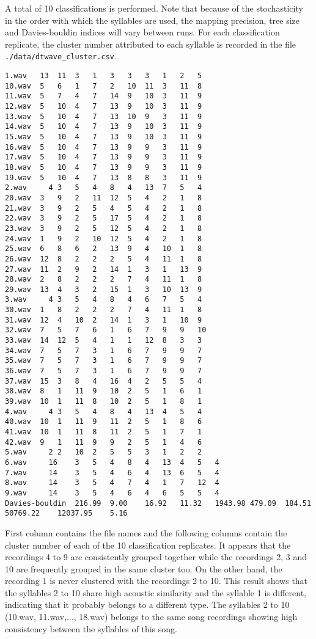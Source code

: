 \documentclass[a4paper]{article}
\begin{document}
A total of 10 classifications is performed.
Note that because of the stochasticity in the order with which the syllables are used, the mapping precision, tree size and Davies-bouldin indices will vary between runs.
For each classification replicate, the cluster number attributed to each syllable is recorded in the file \texttt{./data/dtwave\_cluster.csv}.

\color{lightgray}
\begin{verbatim}
1.wav 	13	11	3	1	3	3	3	1	2	5	
10.wav	5	6	1	7	2	10	11	3	11	8	
11.wav	5	7	4	7	14	9	10	3	11	9	
12.wav	5	10	4	7	13	9	10	3	11	9	
13.wav	5	10	4	7	13	10	9	3	11	9	
14.wav	5	10	4	7	13	9	10	3	11	9	
15.wav	5	10	4	7	13	9	10	3	11	9	
16.wav	5	10	4	7	13	9	9	3	11	9	
17.wav	5	10	4	7	13	9	9	3	11	9	
18.wav	5	10	4	7	13	9	9	3	11	9	
19.wav	5	10	4	7	13	8	8	3	11	9	
2.wav	  4	3	5	4	8	4	13	7	5	4	
20.wav	3	9	2	11	12	5	4	2	1	8	
21.wav	3	9	2	5	4	5	4	2	1	8	
22.wav	3	9	2	5	17	5	4	2	1	8	
23.wav	3	9	2	5	12	5	4	2	1	8	
24.wav	1	9	2	10	12	5	4	2	1	8	
25.wav	6	8	6	2	13	9	4	10	1	8	
26.wav	12	8	2	2	2	5	4	11	1	8	
27.wav	11	2	9	2	14	1	3	1	13	9	
28.wav	2	8	2	2	2	7	4	11	1	8	
29.wav	13	4	3	2	15	1	3	10	13	9	
3.wav	  4	3	5	4	8	4	6	7	5	4	
30.wav	1	8	2	2	2	7	4	11	1	8	
31.wav	12	4	10	2	14	1	3	1	10	9	
32.wav	7	5	7	6	1	6	7	9	9	10	
33.wav	14	12	5	4	1	1	12	8	3	3	
34.wav	7	5	7	3	1	6	7	9	9	7	
35.wav	7	5	7	3	1	6	7	9	9	7	
36.wav	7	5	7	3	1	6	7	9	9	7	
37.wav	15	3	8	4	16	4	2	5	5	4	
38.wav	8	1	11	9	10	2	5	1	6	1	
39.wav	10	1	11	8	10	2	5	1	8	1	
4.wav	  4	3	5	4	8	4	13	4	5	4	
40.wav	10	1	11	9	11	2	5	1	8	6	
41.wav	10	1	11	8	11	2	5	1	7	1	
42.wav	9	1	11	9	9	2	5	1	4	6	
5.wav	  2	2	10	2	5	5	3	1	2	2	
6.wav	  16	3	5	4	8	4	13	4	5	4	
7.wav	  14	3	5	4	6	4	13	6	5	4	
8.wav	  14	3	5	4	7	4	1	7	12	4	
9.wav	  14	3	5	4	6	4	6	5	5	4	
Davies-bouldin	216.99	9.00	16.92	11.32	1943.98	479.09	184.51	50769.22	12037.95	5.16	
\end{verbatim}
\color{black}

First column contains the file names and the following columns contain the cluster number of each of the 10 classification replicates.
It appears that the recordings 4 to 9 are consistently grouped together while the recordings 2, 3 and 10 are frequently grouped in the same cluster too.
On the other hand, the recording 1 is never clustered with the recordings 2 to 10.
This result shows that the syllables 2 to 10 share high acoustic similarity and the syllable 1 is different, indicating that it probably belongs to a different type. 
The syllables 2 to 10 (10.wav, 11.wav,..., 18.wav) belongs to the same song recordings showing high consistency between the syllables of this song.
\end{document}
